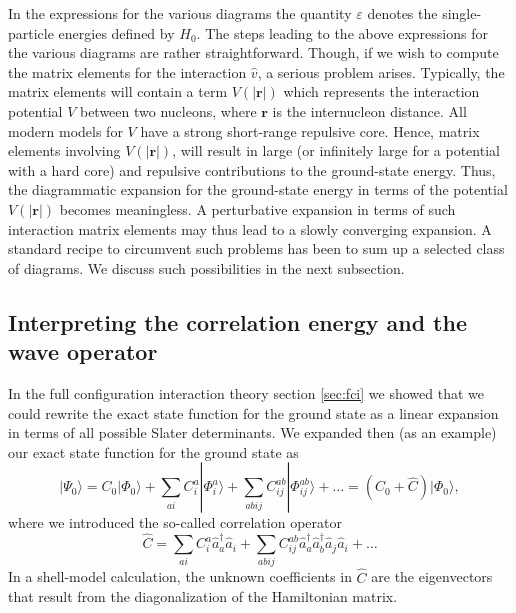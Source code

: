   In the expressions for the various diagrams the quantity $\varepsilon$ denotes the single-particle energies
  defined by $H_0$.  The steps leading to the above expressions for
  the various diagrams are rather straightforward. Though, if we wish
  to compute the matrix elements for the interaction $\hat{v}$, a serious
  problem arises. Typically, the matrix elements will contain a term
  $V(|{\mathbf r}|)$
  which represents the interaction potential $V$ between two nucleons,
  where ${\mathbf r}$ is the internucleon distance.  All modern models
  for $V$ have a strong short-range repulsive core. Hence, matrix
  elements involving $V(|{\mathbf r}|)$, will result in large (or
  infinitely large for a potential with a hard core) and repulsive
  contributions to the ground-state energy. Thus, the diagrammatic
  expansion for the ground-state energy in terms of the potential
  $V(|{\mathbf r}|)$ becomes meaningless. A perturbative expansion in terms of
such interaction matrix elements may thus lead to a slowly converging expansion.
A standard recipe to circumvent such problems has been to sum up 
a selected class of diagrams. We discuss such possibilities in the next subsection.  



  \subsection{Interpreting the correlation energy and the wave operator}

  In the full configuration interaction theory  section \ref{sec:fci} we showed that we could rewrite the exact state
  function for the ground state as a linear expansion in terms of all
  possible Slater determinants.  We expanded then (as an example) our
  exact state function for the ground state as
  \[
  |\Psi_0\rangle=C_0|\Phi_0\rangle+\sum_{ai}C_i^a|\Phi_i^a\rangle+\sum_{abij}C_{ij}^{ab}|\Phi_{ij}^{ab}\rangle+\dots
  =(C_0+\hat{C})|\Phi_0\rangle,
  \]
  where we introduced the so-called correlation operator
  \[
  \hat{C}=\sum_{ai}C_i^a\hat{a}_{a}^{\dagger}\hat{a}_i
  +\sum_{abij}C_{ij}^{ab}\hat{a}_{a}^{\dagger}\hat{a}_{b}^{\dagger}\hat{a}_j\hat{a}_i+\dots
  \]
  In a shell-model calculation, the unknown coefficients in $\hat{C}$
  are the eigenvectors that result from the diagonalization of the
  Hamiltonian matrix.

